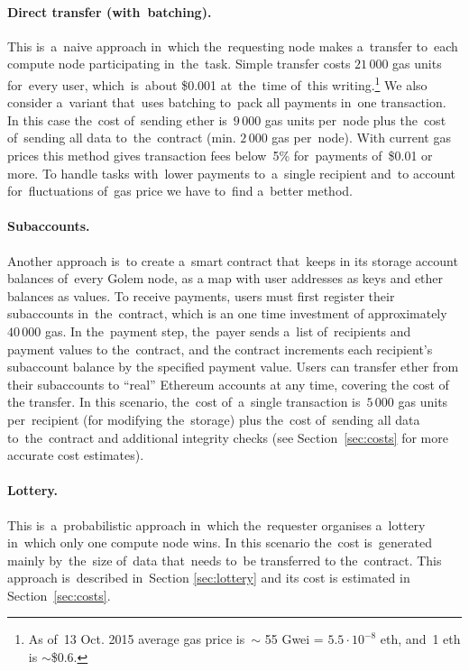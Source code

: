 \documentclass[a4paper]{article}
\begin{document}
    \paragraph{Direct transfer (with~batching).}
    This is~a~naive approach in~which the~requesting node makes a~transfer to~each compute node participating in~the~task.
    Simple transfer costs $21\,000$ gas units for~every user, which~is~about \$0.001 at~the~time of~this writing.\footnote{%
      As of~13 Oct. 2015 average gas price is~$\sim$ 55 Gwei = $5.5 \cdot 10^{-8}$ eth, and~1 eth is $\sim$\$0.6.}
    We also consider a~variant that~uses batching\cite{BUTERIN} to~pack all payments in~one transaction.
    In this case the~cost of~sending ether is~$9\,000$ gas units per~node plus the~cost of~sending all data
    to~the~contract (min. $2\,000$ gas per~node). With current gas prices this method gives transaction fees
    below~5\% for~payments of~\$0.01 or more. To handle tasks with~lower payments to~a~single recipient and~to
    account for~fluctuations of~gas price we have to~find a~better method.

    \paragraph{Subaccounts.}
    Another approach is~to create a~smart contract that~keeps in its storage account balances of~every Golem node,
    as a map with user addresses as keys and ether balances as values. 
    To receive payments, users must first register their subaccounts in~the~contract, which is an one time investment
    of approximately $40\,000$ gas.
    In the~payment step, the~payer sends a~list of~recipients and payment values to the~contract, and
    the contract increments each recipient's subaccount balance by the specified payment value. 
    Users can transfer ether from their subaccounts to ``real'' Ethereum accounts at any time, covering the cost of the transfer.
    In this scenario, the~cost of~a~single transaction is~$5\,000$ gas units per~recipient (for modifying the~storage)
    plus the~cost of~sending all data to~the~contract and additional integrity checks (see Section~\ref{sec:costs} for
    more accurate cost estimates).

    \paragraph{Lottery.} 
    This is~a~probabilistic approach in~which the~requester organises a~lottery in~which only one compute node
    wins. In this scenario the~cost is~generated mainly by~the~size of~data that~needs to~be transferred to
    the~contract. This approach is~described in~Section \ref{sec:lottery} and its cost is estimated in Section~\ref{sec:costs}.
\end{document}
